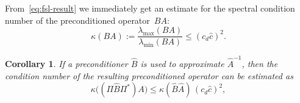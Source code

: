\documentclass[11pt]{article}
\newtheorem{corollary}[lemma]{Corollary}
\theoremstyle{remark}
\begin{document}

From~\eqref{eq:fsl-result} we immediately get an estimate for the
spectral condition number of the preconditioned operator~$BA$:
\begin{equation}
  \label{eq:cond}
  \kappa(BA) := \frac{\lambda_{\max}(BA)}%
    {\lambda_{\min}(BA)} \le (c_d\widehat{c})^2.
\end{equation}

\begin{corollary}
  \label{cor:approx}
  If a preconditioner $\widehat{B}$ is used to approximate $\widehat{A}^{-1}$, then the condition number of the resulting preconditioned operator can be estimated as
  \begin{equation}\label{eq:cond-approx}
    \kappa\bigl((\Pi\widehat{B}\Pi^*)A\bigr)
    \le \kappa(\widehat{B}\widehat{A})\,(c_d\widehat{c})^2,
  \end{equation}
\end{corollary}

\end{document}
